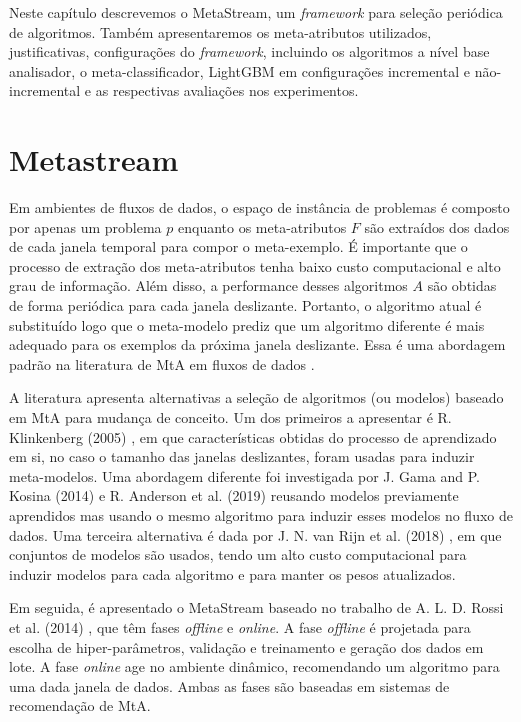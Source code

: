 \label{chap:metodologia}
Neste capítulo descrevemos o MetaStream, um \textit{framework} para seleção periódica de algoritmos. Também apresentaremos os meta-atributos utilizados, justificativas, configurações do \textit{framework}, incluindo os algoritmos a nível base analisador, o meta-classificador, LightGBM em configurações incremental e não-incremental e as respectivas avaliações nos experimentos.

\section{Metastream}
\label{sec:metastream}

Em ambientes de fluxos de dados, o espaço de instância de problemas é composto
por apenas um problema $p$ enquanto os meta-atributos $F$ são extraídos dos
dados de cada janela temporal para compor o meta-exemplo.
É importante que o processo de extração dos meta-atributos tenha baixo custo
computacional e alto grau de informação.
Além disso, a  performance desses algoritmos $A$ são obtidas de forma periódica para cada janela deslizante. Portanto, o algoritmo atual é substituído logo que o meta-modelo prediz que um
algoritmo diferente é mais adequado para os exemplos da próxima janela
deslizante. Essa é uma abordagem padrão na literatura de MtA em fluxos de dados
\cite{read2012batch, vanrijn2014algorithm, Anderson2019}.

A literatura apresenta alternativas a seleção de algoritmos (ou modelos)
baseado em MtA para mudança de conceito. Um dos primeiros a apresentar é R.
Klinkenberg (2005) \cite{klinkenberg2005}, em que características obtidas do
processo de aprendizado em si, no caso o tamanho das janelas deslizantes, foram
usadas para induzir meta-modelos.
Uma abordagem diferente foi investigada por J. Gama and P. Kosina (2014)
\cite{gama2014} e R. Anderson et al. (2019) \cite{Anderson2019}
reusando modelos previamente aprendidos mas usando o mesmo algoritmo para
induzir esses modelos no fluxo de dados. Uma terceira alternativa é dada por J.
N. van Rijn et al. (2018) \cite{VanRijn2018}, em que conjuntos de
modelos são usados, tendo um alto custo computacional para induzir modelos para cada
algoritmo e para manter os pesos atualizados.

Em seguida, é apresentado o MetaStream baseado no trabalho de A. L. D. Rossi et
al. (2014) \cite{rossi2014metastream}, que têm fases \textit{offline} e \textit{online}.
A fase \textit{offline} é projetada para escolha de hiper-parâmetros, validação e
treinamento e geração dos dados em lote. A fase \textit{online} age no ambiente dinâmico, recomendando um algoritmo para uma dada janela de dados. Ambas as fases são baseadas em sistemas de recomendação de MtA.


